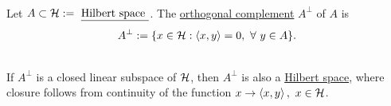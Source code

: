 \vspace{3pt}
\begin{definition}\ \\
Let $A \subset \mathcal{H} := \text{ \underline{Hilbert space }}$. The \underline{orthogonal complement} $A^{\perp}$ of $A$ is 
\begin{equation*}
    A^\perp := \{x \in \mathcal{H}: \left\langle x, y \right\rangle = 0,\ \forall\ y \in A\}.
\end{equation*}
\end{definition}
\begin{remark}\ \\
    If $A^\perp$ is a closed linear subspace of $\mathcal{H}$, then $A^\perp$ is also a \underline{Hilbert space}, where closure follows from continuity of the function $x \to \left\langle x, y \right\rangle,\ x \in \mathcal{H}$.
\end{remark}

